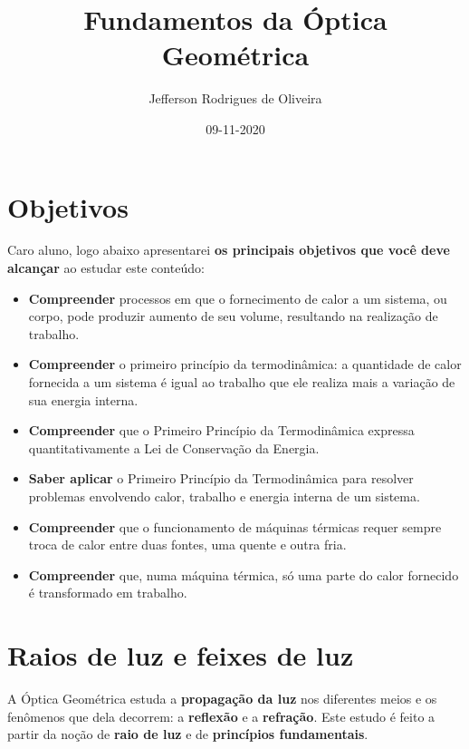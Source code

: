 \documentclass[11pt,twocolumn,oneside]{article}
\title{Fundamentos da Óptica Geométrica}
\author{Jefferson Rodrigues de Oliveira}
\date{09-11-2020}
\begin{document}
\maketitle
\tableofcontents
\hypertarget{x-objetivos}{\section{Objetivos}}
Caro aluno, logo abaixo apresentarei \textbf{os principais objetivos que você deve alcançar} ao estudar este conteúdo:


\begin{itemize}

\item \textbf{Compreender} processos em que o fornecimento de calor a um sistema, ou corpo, pode produzir aumento de seu volume, resultando na realização de trabalho.

\item \textbf{Compreender} o primeiro princípio da termodinâmica: a quantidade de calor fornecida a um sistema é igual ao trabalho que ele realiza mais a variação de sua energia interna.

\item \textbf{Compreender} que o Primeiro Princípio da Termodinâmica expressa quantitativamente a Lei de Conservação da Energia.

\item \textbf{Saber aplicar} o Primeiro Princípio da Termodinâmica para resolver problemas envolvendo calor, trabalho e energia interna de um sistema.

\item \textbf{Compreender} que o funcionamento de máquinas térmicas requer sempre troca de calor entre duas fontes, uma quente e outra fria.

\item \textbf{Compreender} que, numa máquina térmica, só uma parte do calor fornecido é transformado em trabalho.

\end{itemize}


\hypertarget{x-raios-de-luz-e-feixes-de-luz}{\section{Raios de luz e feixes de luz}}
A Óptica Geométrica estuda a \textbf{propagação da luz} nos diferentes meios e os fenômenos que dela decorrem: a \textbf{reflexão} e a \textbf{refração}. Este estudo é feito a partir da noção de \textbf{raio de luz} e de \textbf{princípios fundamentais}.
\end{document}
